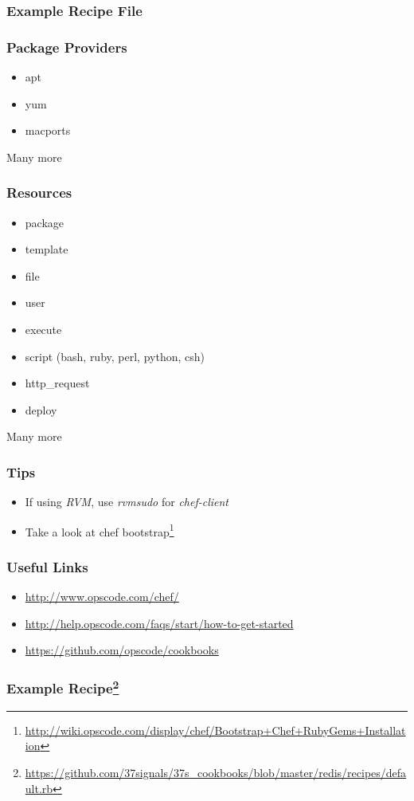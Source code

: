 \documentclass[16pt]{beamer}
\begin{document}
\begin{frame}
  \frametitle{Example Recipe File}
  \begin{footnotesize}
    
    \label{postgres_server_recipe}
    \end{footnotesize}
\end{frame}

\begin{frame}
  \frametitle{Package Providers}
  \begin{itemize}
    \item apt
    \item yum
    \item macports
  \end{itemize}
  \begin{center}
    \large Many more
  \end{center}
\end{frame}

\begin{frame}
  \frametitle{Resources}
  \begin{itemize}
    \item package
    \item template
    \item file
    \item user
    \item execute
    \item script (bash, ruby, perl, python, csh)
    \item http\_request
    \item deploy
  \end{itemize}
  \pause
  \begin{center}
    \large Many more
  \end{center}
\end{frame}

\begin{frame}
  \frametitle{Tips}
  \begin{itemize}
    \item If using \emph{RVM}, use \emph{rvmsudo} for \emph{chef-client}
    \item Take a look at chef bootstrap\footnote{\url{http://wiki.opscode.com/display/chef/Bootstrap+Chef+RubyGems+Installation}}
  \end{itemize}
\end{frame}

\begin{frame}
  \frametitle{Useful Links}
  \begin{footnotesize}
    \begin{itemize}
      \item \url{http://www.opscode.com/chef/}
      \item \url{http://help.opscode.com/faqs/start/how-to-get-started}
      \item \url{https://github.com/opscode/cookbooks}
    \end{itemize}
  \end{footnotesize}
\end{frame}

\begin{frame}
  \frametitle{Example Recipe\footnote{\url{https://github.com/37signals/37s_cookbooks/blob/master/redis/recipes/default.rb}}}
  
  \label{redis_recipe}
\end{frame}
\end{document}
